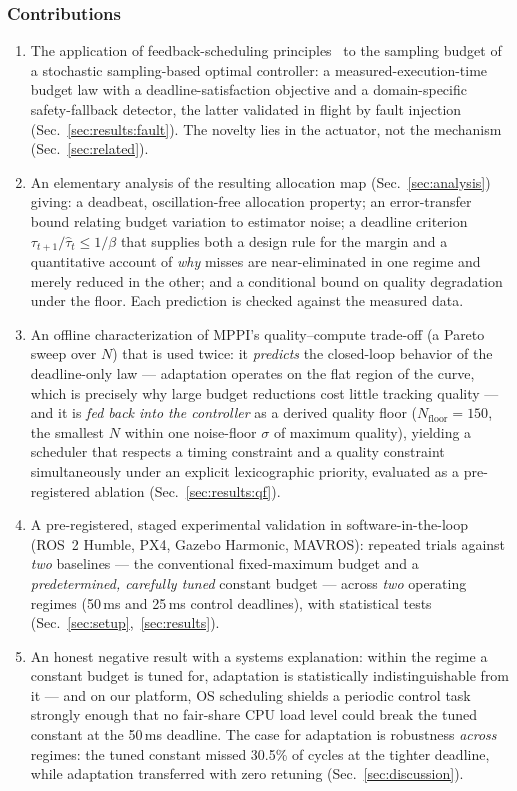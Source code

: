 \documentclass[conference]{IEEEtran}
\begin{document}
\subsubsection*{Contributions}
\begin{enumerate}
  \item The application of feedback-scheduling
  principles~\cite{lu2002feedback,cervin2002feedback} to the sampling
  budget of a stochastic sampling-based optimal controller: a
  measured-execution-time budget law with a deadline-satisfaction
  objective and a domain-specific safety-fallback detector, the latter
  validated in flight by fault injection
  (Sec.~\ref{sec:results:fault}). The novelty lies in the actuator, not
  the mechanism (Sec.~\ref{sec:related}).
  \item An elementary analysis of the resulting allocation map
  (Sec.~\ref{sec:analysis}) giving: a deadbeat, oscillation-free
  allocation property; an error-transfer bound relating budget
  variation to estimator noise; a deadline criterion
  $\tau_{t+1}/\hat{\tau}_t \le 1/\beta$ that supplies both a design
  rule for the margin and a quantitative account of \emph{why} misses
  are near-eliminated in one regime and merely reduced in the other;
  and a conditional bound on quality degradation under the floor. Each
  prediction is checked against the measured data.
  \item An offline characterization of MPPI's quality--compute trade-off
  (a Pareto sweep over $N$) that is used twice: it \emph{predicts} the
  closed-loop behavior of the deadline-only law --- adaptation operates
  on the flat region of the curve, which is precisely why large budget
  reductions cost little tracking quality --- and it is \emph{fed back
  into the controller} as a derived quality floor
  ($N_{\mathrm{floor}} = 150$, the smallest $N$ within one noise-floor
  $\sigma$ of maximum quality), yielding a scheduler that respects a
  timing constraint and a quality constraint simultaneously under an
  explicit lexicographic priority, evaluated as a pre-registered
  ablation (Sec.~\ref{sec:results:qf}).
  \item A pre-registered, staged experimental validation in
  software-in-the-loop (ROS~2 Humble, PX4, Gazebo Harmonic, MAVROS):
  repeated trials against \emph{two} baselines --- the conventional
  fixed-maximum budget and a \emph{predetermined, carefully tuned}
  constant budget --- across \emph{two} operating regimes (50\,ms and
  25\,ms control deadlines), with statistical tests
  (Sec.~\ref{sec:setup},~\ref{sec:results}).
  \item An honest negative result with a systems explanation: within the
  regime a constant budget is tuned for, adaptation is statistically
  indistinguishable from it --- and on our platform, OS scheduling
  shields a periodic control task strongly enough that no fair-share CPU
  load level could break the tuned constant at the 50\,ms deadline. The
  case for adaptation is robustness \emph{across} regimes: the tuned
  constant missed 30.5\% of cycles at the tighter deadline, while
  adaptation transferred with zero retuning (Sec.~\ref{sec:discussion}).
\end{enumerate}
\end{document}
